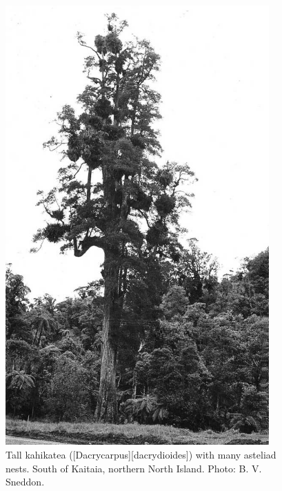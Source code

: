 \begin{figure}[htb]
	\centering
	\begin{minipage}[t]{0.437\textwidth}
		\centering
		\includegraphics[width=0.9\textwidth]{graphics/figure39kahikatea.jpg}
    	\caption[Tall kahikatea with many asteliad nests]{Tall kahikatea ([Dacrycarpus][dacrydioides]) with many asteliad nests.
    	South of Kaitaia, northern North Island.
    	Photo: B. V. Sneddon.}%
    	\label{fig:39kahikatea}
	\end{minipage}\hfill%
	\begin{minipage}[t]{0.543\textwidth}
    	\centering

\end{minipage}
\end{figure}
